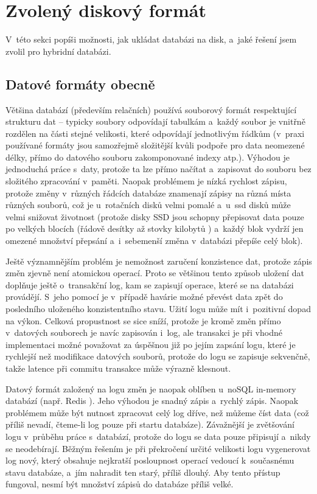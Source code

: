 \section{Zvolený diskový formát}

V~této sekci popíši možnosti, jak ukládat databázi na disk, a~jaké řešení jsem
zvolil pro hybridní databázi.

\subsection{Datové formáty obecně}
Většina databází (především relačních) používá souborový formát respektující strukturu dat
-- typicky soubory odpovídají tabulkám a~každý soubor je vnitřně rozdělen na části
stejné velikosti, které odpovídají jednotlivým řádkům (v~praxi používané formáty
jsou samozřejmě složitější kvůli podpoře pro data neomezené délky, přímo do datového
souboru zakomponované indexy atp.). Výhodou je jednoduchá práce s~daty, protože
ta lze přímo načítat a~zapisovat do souboru bez složitého zpracování v~paměti. Naopak
problémem je nízká rychlost zápisu, protože změny v~různých řádcích databáze znamenají
zápisy na různá místa různých souborů, což je u~rotačních disků velmi pomalé a~u~ssd
disků může velmi snižovat životnost (protože disky SSD jsou schopny přepisovat data
pouze po velkých blocích (řádově desítky až stovky kilobytů \cite{ssd})
a~každý blok vydrží jen omezené množství přepsání a~i~sebemenší změna v~databázi přepíše
celý blok).

Ještě významnějším problém je nemožnost zaručení konzistence dat, protože
zápis změn zjevně není atomickou operací. Proto se většinou tento způsob uložení dat
doplňuje ještě o~transakční log, kam se zapisují operace, které se na databázi provádějí.
S~jeho pomocí je v~případě havárie možné převést data zpět do posledního uloženého
konzistentního stavu. Užití logu může mít i~pozitivní dopad na výkon. Celková propustnost
se sice sníží, protože je kromě změn přímo v~datových souborech je navíc zapisován
i~log, ale transakci je při vhodné implementaci možné považovat za úspěšnou již
po jejím zapsání logu, které je rychlejší než modifikace datových souborů, protože
do logu se zapisuje sekvenčně, takže latence při commitu transakce může výrazně klesnout.

Datový formát založený na logu změn je naopak oblíben u~noSQL in-memory databází
(např. Redis \cite{Redis}).
Jeho výhodou je snadný zápis a~rychlý zápis. Naopak problémem může být nutnost
zpracovat celý log dříve, než můžeme číst data (což příliš nevadí, čteme-li
log pouze při startu databáze). Závažnější je zvětšování logu v~průběhu práce
s~databází, protože do logu se data pouze připisují a~nikdy se neodebírají.
Běžným řešením je při překročení určité velikosti logu vygenerovat log
nový, který obsahuje nejkratší posloupnost operací vedoucí k~současnému stavu databáze,
a~jím nahradit ten starý, příliš dlouhý. Aby tento přístup fungoval, nesmí
být množství zápisů do databáze příliš velké.


